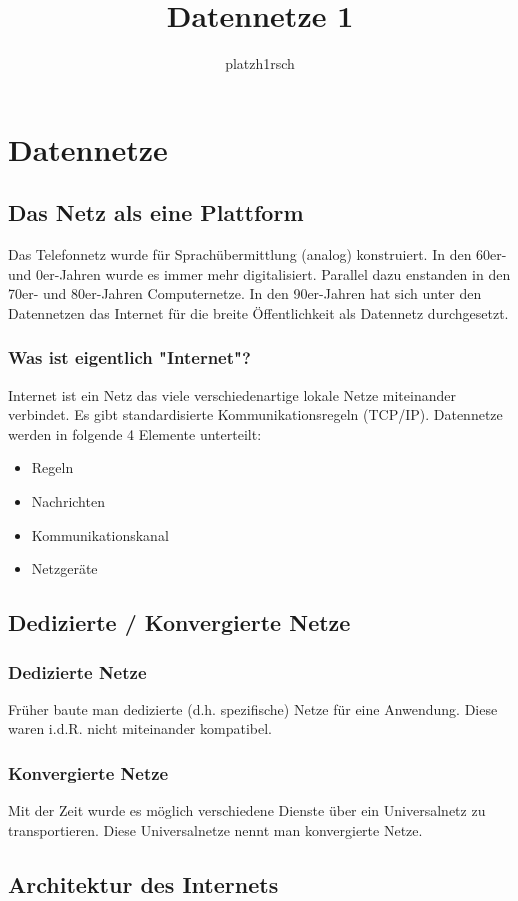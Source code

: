 \documentclass[11pt,a4paper]{article}
\author{platzh1rsch}
\title{Datennetze 1}
\begin{document}
\section{Datennetze}
\subsection{Das Netz als eine Plattform}
Das Telefonnetz wurde für Sprachübermittlung (analog) konstruiert. In den 60er- und 0er-Jahren wurde es immer mehr digitalisiert. Parallel dazu enstanden in den 70er- und 80er-Jahren Computernetze. \linebreak
In den 90er-Jahren hat sich unter den Datennetzen das Internet für die breite Öffentlichkeit als Datennetz durchgesetzt.
\subsubsection{Was ist eigentlich "Internet"?}
Internet ist ein Netz das viele verschiedenartige lokale Netze miteinander verbindet. Es gibt standardisierte Kommunikationsregeln (TCP/IP).\linebreak
Datennetze werden in folgende 4 Elemente unterteilt:\linebreak
\begin{itemize}
\item Regeln
\item Nachrichten
\item Kommunikationskanal
\item Netzgeräte
\end{itemize}
\subsection{Dedizierte / Konvergierte Netze}
\subsubsection{Dedizierte Netze}
Früher baute man dedizierte (d.h. spezifische) Netze für eine Anwendung. Diese waren i.d.R. nicht miteinander kompatibel.
\subsubsection{Konvergierte Netze}
Mit der Zeit wurde es möglich verschiedene Dienste über ein Universalnetz zu transportieren. Diese Universalnetze nennt man konvergierte Netze.

\subsection{Architektur des Internets}
\end{document}
